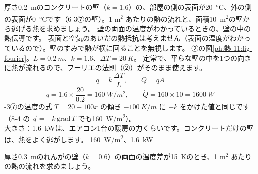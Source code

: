 \label{ph:熱-11:ex2}
\begin{phreidai}[コンクリートの壁]
厚さ\qty{0.2}{m}のコンクリートの壁（$k=1.6$）の、部屋の側の表面が\qty{20}{\celsius}、外の側の表面が\qty{0}{\celsius}です（6-3⑦の壁）。1 m$^2$ あたりの熱の流れと、面積\qty{10}{m^2}の壁から逃げる熱を求めましょう。
\phbamen
壁の両面の温度がわかっているときの、壁の中の熱伝導です。
\phmushi
表面と空気のあいだの熱抵抗は考えません（表面の温度がわかっているので）。壁のすみで熱が横に回ることを無視します。
\phzu
②の図\ref{ph:熱-11:fig-fourier}。$L=\qty{0.2}{m}$、$k=1.6$、$\Delta T=\qty{20}{K}$。
\phriyu
定常で、平らな壁の中を1つの向きに熱が流れるので、フーリエの法則（②）がそのまま使えます。
\phtateru
\[q=k\,\frac{\Delta T}{L},\qquad\dot Q=qA\]
\phtoku
\[q=1.6\times\frac{20}{0.2}=\qty{160}{W/m^2},\qquad\dot Q=160\times10=\qty{1600}{W}\]
-3⑦の温度の式 $T=20-100x$ の傾き $\qty{-100}{K/m}$ に $-k$ をかけた値と同じです（8-4 の $\vec q=-k\,\mathrm{grad}\,T$ でも\qty{160}{W/m^2}）。\\
大きさ：\qty{1.6}{kW}は、エアコン1台の暖房の力くらいです。コンクリートだけの壁は、熱をよく逃がします。
\kotae \qty{160}{W/m^2}、\qty{1.6}{kW}
\end{phreidai}
\begin{jibun}
厚さ\qty{0.3}{m}のれんがの壁（$k=0.6$）の両面の温度差が\qty{15}{K}のとき、1 m$^2$ あたりの熱の流れを求めましょう。
\end{jibun}

